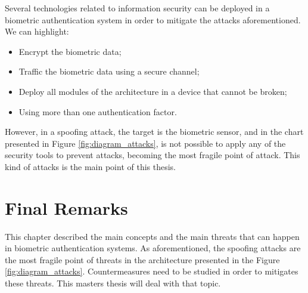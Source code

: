 Several technologies related to information security can be deployed in a biometric authentication system in order to mitigate the attacks aforementioned. We can highlight:
\begin{itemize}
        \item Encrypt the biometric data;
        \item Traffic the biometric data using a secure channel;
        \item Deploy all modules of the architecture in a device that cannot be broken;
        \item Using more than one authentication factor.
\end{itemize}
However, in a spoofing attack, the target is the biometric sensor, and in the chart presented in Figure \ref{fig:diagram_attacks}, is not possible to apply any of the security tools to prevent attacks, becoming the most fragile point of attack. This kind of attacks is the main point of this thesis.

\section{Final Remarks}
\label{sec:FinalRemarks}

This chapter described the main concepts and the main threats that can happen in biometric authentication systems. As aforementioned, the spoofing attacks are the most fragile point of threats in the architecture presented in the Figure \ref{fig:diagram_attacks}. Countermeasures need to be studied in order to mitigates these threats. This masters thesis will deal with that topic.



